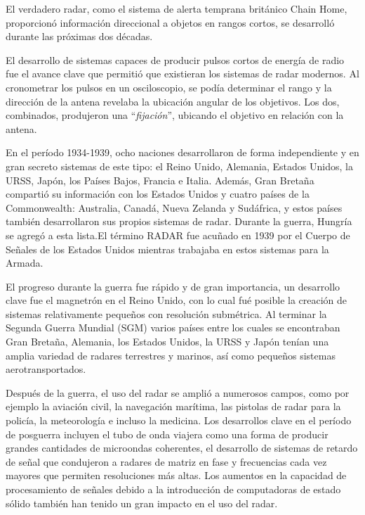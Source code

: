 El verdadero radar, como el sistema de alerta temprana británico Chain Home, proporcionó información direccional a objetos en rangos cortos, se desarrolló durante las próximas dos décadas.

El desarrollo de sistemas capaces de producir pulsos cortos de energía de radio fue el avance clave que permitió que existieran los sistemas de radar modernos. Al cronometrar los pulsos en un osciloscopio, se podía determinar el rango y la dirección de la antena revelaba la ubicación angular de los objetivos. Los dos, combinados, produjeron una ``\emph{fijación}'', ubicando el objetivo en relación con la antena. 

En el período 1934-1939, ocho naciones desarrollaron de forma independiente y en gran secreto sistemas de este tipo: el Reino Unido, Alemania, Estados Unidos, la URSS, Japón, los Países Bajos, Francia e Italia. Además, Gran Bretaña compartió su información con los Estados Unidos y cuatro países de la Commonwealth: Australia, Canadá, Nueva Zelanda y Sudáfrica, y estos países también desarrollaron sus propios sistemas de radar. Durante la guerra, Hungría se agregó a esta lista.El término RADAR fue acuñado en 1939 por el Cuerpo de Señales de los Estados Unidos mientras trabajaba en estos sistemas para la Armada.

El progreso durante la guerra fue rápido y de gran importancia, un desarrollo clave fue el magnetrón en el Reino Unido, con lo cual fué posible la creación de sistemas relativamente pequeños con resolución submétrica. Al terminar la Segunda Guerra Mundial (SGM) varios países entre los cuales se encontraban Gran Bretaña, Alemania, los Estados Unidos, la URSS y Japón tenían una amplia variedad de radares terrestres y marinos, así como pequeños sistemas aerotransportados.

Después de la guerra, el uso del radar se amplió a numerosos campos, como por ejemplo  la aviación civil, la navegación marítima, las pistolas de radar para la policía, la meteorología e incluso la medicina. Los desarrollos clave en el período de posguerra incluyen el tubo de onda viajera como una forma de producir grandes cantidades de microondas coherentes, el desarrollo de sistemas de retardo de señal que condujeron a radares de matriz en fase y frecuencias cada vez mayores que permiten resoluciones más altas. Los aumentos en la capacidad de procesamiento de señales debido a la introducción de computadoras de estado sólido también han tenido un gran impacto en el uso del radar.


